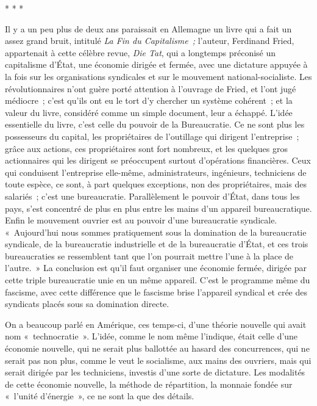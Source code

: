 \documentclass[french,twoside]{book} %
\begin{document}
\begin{center}
* * *\end{center}
\noindent Il y a un peu plus de deux ans paraissait en Allemagne un livre qui a fait un assez grand bruit, intitulé {\itshape La Fin du Capitalisme ;} l'auteur, Ferdinand Fried, appartenait à cette célèbre revue, {\itshape Die Tat}, qui a longtemps préconisé un capitalisme d'État, une économie dirigée et fermée, avec une dictature appuyée à la fois sur les organisations syndicales et sur le mouvement national-socialiste. Les révolutionnaires n'ont guère porté attention à l'ouvrage de Fried, et l'ont jugé médiocre ; c'est qu'ils ont eu le tort d'y chercher un système cohérent ; et la valeur du livre, considéré comme un simple document, leur a échappé. L'idée essentielle du livre, c'est celle du pouvoir de la Bureaucratie. Ce ne sont plus les possesseurs du capital, les propriétaires de l'outillage qui dirigent l'entreprise ; grâce aux actions, ces propriétaires sont fort nombreux, et les quelques gros actionnaires qui les dirigent se préoccupent surtout d'opérations financières. Ceux qui conduisent l'entreprise elle-même, administrateurs, ingénieurs, techniciens de toute espèce, ce sont, à part quelques exceptions, non des propriétaires, mais des salariés ; c'est une bureaucratie. Parallèlement le pouvoir d'État, dans tous les pays, s'est concentré de plus en plus entre les mains d'un appareil bureaucratique. Enfin le mouvement ouvrier est au pouvoir d'une bureaucratie syndicale. « Aujourd'hui nous sommes pratiquement sous la domination de la bureaucratie syndicale, de la bureaucratie industrielle et de la bureaucratie d'État, et ces trois bureaucraties se ressemblent tant que l'on pourrait mettre l'une à la place de l'autre. » La conclusion est qu'il faut organiser une économie fermée, dirigée par cette triple bureaucratie unie en un même appareil. C'est le programme même du fascisme, avec cette différence que le fascisme brise l'appareil syndical et crée des syndicats placés sous sa domination directe.\par
On a beaucoup parlé en Amérique, ces temps-ci, d'une théorie nouvelle qui avait nom « technocratie ». L'idée, comme le nom même l'indique, était celle d'une économie nouvelle, qui ne serait plus ballottée au hasard des concurrences, qui ne serait pas non plus, comme le veut le socialisme, aux mains des ouvriers, mais qui serait dirigée par les techniciens, investis d'une sorte de dictature. Les modalités de cette économie nouvelle, la méthode de répartition, la monnaie fondée sur « l'unité d'énergie », ce ne sont la que des détails.\par
\end{document}
